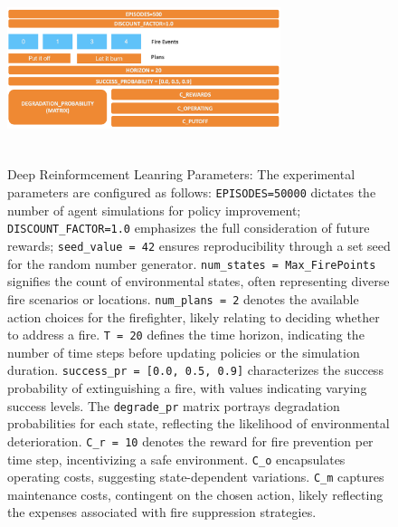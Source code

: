 \documentclass[lettersize,journal]{IEEEtran}
\begin{document}
\begin{figure}[H]
  \centering
  \includegraphics[height=5.5cm,width=8cm]{figs/parameters.png}
  \caption{Deep Reinformcement Leanring Parameters: The experimental parameters are configured as follows: \texttt{EPISODES=50000} dictates the number of agent simulations for policy improvement; \texttt{DISCOUNT\_FACTOR=1.0} emphasizes the full consideration of future rewards; \texttt{seed\_value = 42} ensures reproducibility through a set seed for the random number generator. \texttt{num\_states = Max\_FirePoints} signifies the count of environmental states, often representing diverse fire scenarios or locations. \texttt{num\_plans = 2} denotes the available action choices for the firefighter, likely relating to deciding whether to address a fire. \texttt{T = 20} defines the time horizon, indicating the number of time steps before updating policies or the simulation duration. \texttt{success\_pr = [0.0, 0.5, 0.9]} characterizes the success probability of extinguishing a fire, with values indicating varying success levels. The \texttt{degrade\_pr} matrix portrays degradation probabilities for each state, reflecting the likelihood of environmental deterioration. \texttt{C\_r = 10} denotes the reward for fire prevention per time step, incentivizing a safe environment. \texttt{C\_o} encapsulates operating costs, suggesting state-dependent variations. \texttt{C\_m} captures maintenance costs, contingent on the chosen action, likely reflecting the expenses associated with fire suppression strategies. }
\end{figure}
\end{document}
